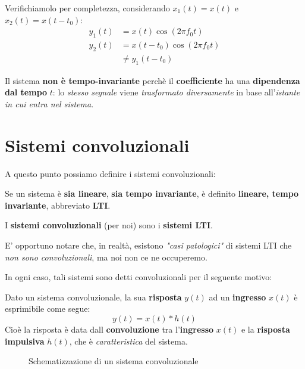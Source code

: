 Verifichiamolo per completezza, considerando $x_{1}(t) = x(t)$ e $x_{2}(t) = x(t-t_{0})$:
\[
    \begin{aligned}
        y_{1}(t) &= x(t)\cos (2\pi f_{0}t) \\ 
        y_{2}(t) &= x(t-t_{0})\cos (2\pi f_{0}t) \\ 
                 &\ne y_{1}(t-t_{0})
    \end{aligned}
\]
\begin{remark}
    Il sistema \textbf{non è tempo-invariante} perchè il \textbf{coefficiente}
    ha una \textbf{dipendenza dal tempo} $t$: lo \textit{stesso segnale}
    viene \textit{trasformato diversamente} in base all'\textit{istante
    in cui entra nel sistema}.
\end{remark}


\section{Sistemi convoluzionali}

A questo punto possiamo definire i sistemi convoluzionali:

\begin{definition}
    Se un sistema è \textbf{sia lineare}, \textbf{sia tempo invariante}, è
    definito \textbf{lineare, tempo invariante}, abbreviato \textbf{LTI}.

    I \textbf{sistemi convoluzionali} (per noi) sono i \textbf{sistemi LTI}.
\end{definition}

E' opportuno notare che, in realtà, esistono \textit{"casi patologici"} di 
sistemi LTI che \textit{non sono convoluzionali}, ma noi non ce ne occuperemo.

In ogni caso, tali sistemi sono detti convoluzionali per il seguente motivo:

\begin{prop}
    Dato un sistema convoluzionale, la sua \textbf{risposta} $y(t)$
    ad un \textbf{ingresso} $x(t)$ è esprimibile come segue:
    \[
        y(t) = x(t) \ast h(t)
    \] 
    Cioè la risposta è data dall \textbf{convoluzione} tra l'\textbf{ingresso}
    $x(t)$ e la \textbf{risposta impulsiva} $h(t)$, che è \textit{caratteristica} 
    del sistema.
\end{prop}

\begin{figure}[!ht]
    \centering
    \caption{Schematizzazione di un sistema convoluzionale}
\end{figure}

